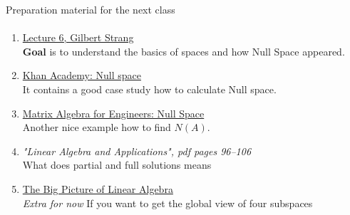 \documentclass[aspectratio=169]{beamer}
\newcommand{\fbckg}[1]{\usebackgroundtemplate{\texttt{[image: \#1]}}}%
\begin{document}
\begin{frame}[t]{Preparation material for the next class}
\framesubtitle{}
    \vspace{-0.35cm}
    \small
    \begin{enumerate}
        \item \href{https://youtu.be/8o5Cmfpeo6g}{Lecture 6, Gilbert Strang} \\ \textbf{Goal} is to understand the basics of spaces and how Null Space appeared.
        \item \href{https://www.youtube.com/watch?v=_uTAdf_AsfQ}{Khan Academy: Null space} \\ It contains a good case study how to calculate Null space.
        \item \href{https://www.youtube.com/watch?v=C8zOd07U3l8}{Matrix Algebra for Engineers: Null Space} \\ Another nice example how to find $N(A)$.
        \item \textit{"Linear Algebra and Applications", pdf pages 96--106 } \\ What does partial and full solutions means
        \item \href{https://www.youtube.com/watch?v=ggWYkes-n6E}{The Big Picture of Linear Algebra} \\ \textit{Extra for now} If you want to get the global view of four subspaces
    \end{enumerate}
\end{frame}

\fbckg{fibeamer/figs/last_page.png}
\frame[plain]{}
\end{document}
